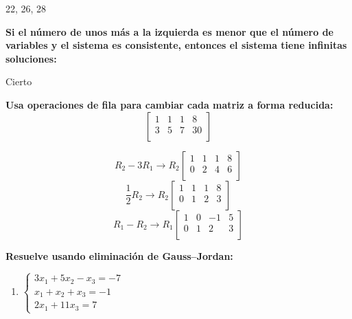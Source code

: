 \documentclass[answers]{exam} %
\begin{document}
\begin{questions}
	\begin{solution}
		22, 26, 28
	\end{solution}

	\vspace{0.5cm}
	\question \large\textbf{Si el número de unos más a la izquierda es menor que el número de variables y el sistema es consistente, entonces el sistema tiene infinitas soluciones:}


	\begin{solution}
		Cierto
	\end{solution}

	\vspace{0.5cm}
	\question \large\textbf{Usa operaciones de fila para cambiar cada matriz a forma reducida:
		\[
			\left[
				\begin{array}{ccc|c}
					{1} & {1} & {1} & 8  \\
					{3} & {5} & {7} & 30 \\
				\end{array}
				\right]
		\]
	}

	\begin{solution}
		\[
			R_2 - 3R_1 \rightarrow R_2
			\left[
				\begin{array}{ccc|c}
					{1} & {1} & {1} & 8 \\
					{0} & {2} & {4} & 6 \\
				\end{array}
				\right]
		\]
		\[
			\frac{1}{2}R_2 \rightarrow R_2
			\left[
				\begin{array}{ccc|c}
					{1} & {1} & {1} & 8 \\
					{0} & {1} & {2} & 3 \\
				\end{array}
				\right]
		\]
		\[
			R_1 - R_2 \rightarrow R_1
			\left[
				\begin{array}{ccc|c}
					{1} & {0} & {-1} & 5 \\
					{0} & {1} & {2}  & 3 \\
				\end{array}
				\right]
		\]
	\end{solution}

	\vspace{0.5cm}

	\question \large\textbf{Resuelve usando eliminación de Gauss–Jordan:}

	\begin{enumerate}[label=\alph*.]
		\item $\displaystyle
			      \left\{
			      \begin{array}{l}
				      3x_1 + 5x_2 - x_3 = -7 \\
				      x_1 + x_2 + x_3 = -1   \\
				      2x_1 + 11x_3 = 7
			      \end{array}
			      \right.
		      $
		      \vspace{0.5cm}


\end{enumerate}
\end{questions}
\end{document}
